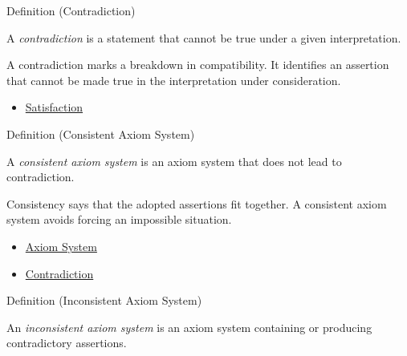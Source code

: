 \begin{definitionbox}{Definition (Contradiction)}
\begin{definition}[Contradiction]
\label{def:axiom-systems-contradiction}
A \emph{contradiction} is a statement that cannot be true under a given
interpretation.
\end{definition}
\end{definitionbox}

\begin{remark*}[Interpretation]
A contradiction marks a breakdown in compatibility. It identifies an assertion
that cannot be made true in the interpretation under consideration.
\end{remark*}

\begin{dependencies}
\begin{itemize}
  \item \hyperref[def:axiom-systems-satisfaction]{Satisfaction}
\end{itemize}
\end{dependencies}

\begin{definitionbox}{Definition (Consistent Axiom System)}
\begin{definition}
\label{def:axiom-systems-consistent-axiom-system}
A \emph{consistent axiom system} is an axiom system that does not lead to
contradiction.
\end{definition}
\end{definitionbox}

\begin{remark*}[Interpretation]
Consistency says that the adopted assertions fit together. A consistent axiom
system avoids forcing an impossible situation.
\end{remark*}

\begin{dependencies}
\begin{itemize}
  \item \hyperref[def:axiom-system]{Axiom System}
  \item \hyperref[def:axiom-systems-contradiction]{Contradiction}
\end{itemize}
\end{dependencies}

\begin{definitionbox}{Definition (Inconsistent Axiom System)}
\begin{definition}
\label{def:axiom-systems-inconsistent-axiom-system}
An \emph{inconsistent axiom system} is an axiom system containing or producing
contradictory assertions.
\end{definition}
\end{definitionbox}

